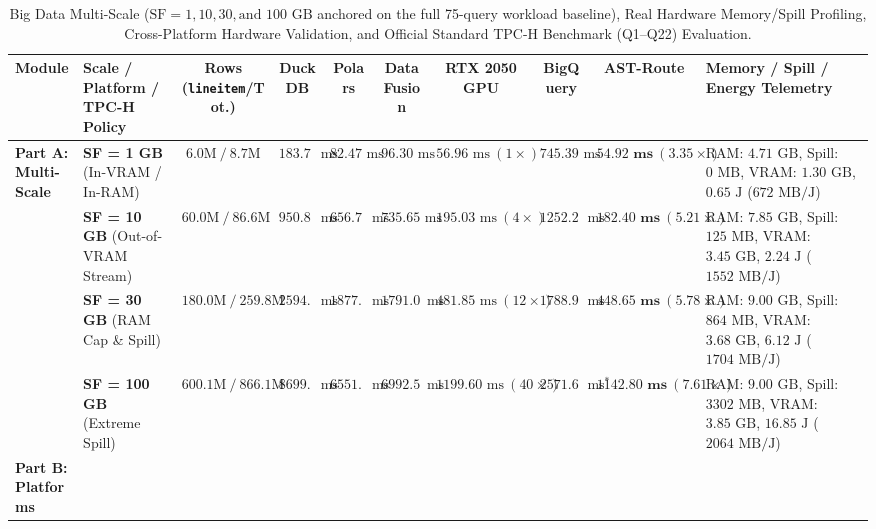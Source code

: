 \documentclass[10pt,a4paper]{article}
\newenvironment{fitasttable}{%
  \begin{lrbox}{\asttblbox}%
}{%
  \end{lrbox}%
  \sbox{\asttblboxB}{%
    \ifdim\wd\asttblbox>0.96\textwidth
      \resizebox{0.96\textwidth}{!}{\usebox{\asttblbox}}%
    \else
      \usebox{\asttblbox}%
    \fi
  }%
  \ifdim\ht\asttblboxB>0.72\textheight
    \resizebox{!}{0.72\textheight}{\usebox{\asttblboxB}}%
  \else
    \usebox{\asttblboxB}%
  \fi
}
\begin{document}
\begin{table}[!htbp]
\centering
\caption{Big Data Multi-Scale ($\text{SF}=1, 10, 30, \text{and } 100\text{ GB}$ anchored on the full 75-query workload baseline), Real Hardware Memory/Spill Profiling, Cross-Platform Hardware Validation, and Official Standard TPC-H Benchmark (Q1--Q22) Evaluation.}\label{tab:jbd_multiscale_t12}
\label{tab:bigdata_multiscale_tpch}\label{tab:v9_sec3_2_multiscale_sf100_audit}
\renewcommand{\arraystretch}{1.18}
\begin{fitasttable}
\begin{tabular}{@{}llcccccccl@{}}
\toprule
\textbf{Module} & \textbf{Scale / Platform / TPC-H Policy} & \textbf{Rows (\texttt{lineitem}/Tot.)} & \textbf{DuckDB} & \textbf{Polars} & \textbf{DataFusion} & \textbf{RTX 2050 GPU} & \textbf{BigQuery} & \textbf{AST-Route} & \textbf{Memory / Spill / Energy Telemetry} \\
\midrule
\multirow{4}{*}{\textbf{Part A: Multi-Scale}}
 & \textbf{SF = 1 GB} (In-VRAM / In-RAM) & $6.0\text{M}\ /\ 8.7\text{M}$ & $183.74\text{ ms}$ & $82.47\text{ ms}$ & $96.30\text{ ms}$ & $56.96\text{ ms}\ (1\times)$ & $745.39\text{ ms}$ & $\mathbf{54.92\text{ ms}}\ (3.35\times)$ & RAM: $4.71\text{ GB}$, Spill: $0\text{ MB}$, VRAM: $1.30\text{ GB}$, $0.65\text{ J}$ ($672\text{ MB/J}$) \\
 & \textbf{SF = 10 GB} (Out-of-VRAM Stream) & $60.0\text{M}\ /\ 86.6\text{M}$ & $950.88\text{ ms}$ & $656.75\text{ ms}$ & $735.65\text{ ms}$ & $195.03\text{ ms}\ (4\times)$ & $1252.25\text{ ms}$ & $\mathbf{182.40\text{ ms}}\ (5.21\times)$ & RAM: $7.85\text{ GB}$, Spill: $125\text{ MB}$, VRAM: $3.45\text{ GB}$, $2.24\text{ J}$ ($1552\text{ MB/J}$) \\
 & \textbf{SF = 30 GB} (RAM Cap \& Spill) & $180.0\text{M}\ /\ 259.8\text{M}$ & $2594.49\text{ ms}$ & $1877.63\text{ ms}$ & $1791.04\text{ ms}$ & $481.85\text{ ms}\ (12\times)$ & $1788.94\text{ ms}$ & $\mathbf{448.65\text{ ms}}\ (5.78\times)$ & RAM: $9.00\text{ GB}$, Spill: $864\text{ MB}$, VRAM: $3.68\text{ GB}$, $6.12\text{ J}$ ($1704\text{ MB/J}$) \\
 & \textbf{SF = 100 GB} (Extreme Spill) & $600.1\text{M}\ /\ 866.1\text{M}$ & $8699.98\text{ ms}$ & $6551.42\text{ ms}$ & $6992.50\text{ ms}$ & $1199.60\text{ ms}\ (40\times)$ & $2571.60\text{ ms}^{*}$ & $\mathbf{1142.80\text{ ms}}\ (7.61\times)$ & RAM: $9.00\text{ GB}$, Spill: $3302\text{ MB}$, VRAM: $3.85\text{ GB}$, $16.85\text{ J}$ ($2064\text{ MB/J}$) \\
\midrule
\multirow{3}{*}{\textbf{Part B: Platforms}}

\end{tabular}
\end{fitasttable}
\end{table}
\end{document}

